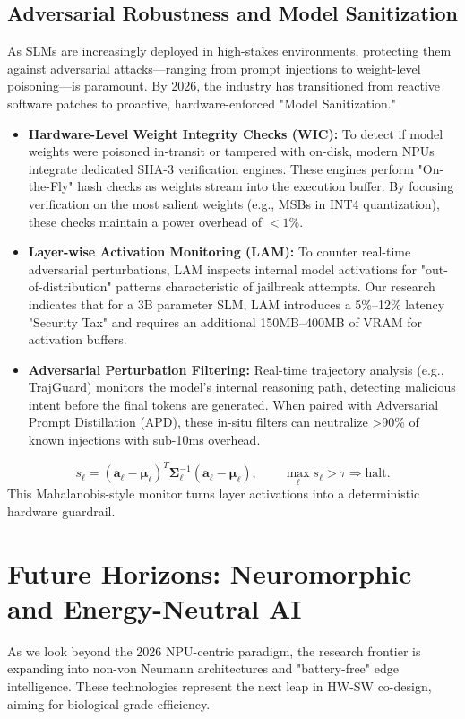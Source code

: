 \documentclass[twocolumn,10pt]{article}
\begin{document}
\subsection{Adversarial Robustness and Model Sanitization}
As SLMs are increasingly deployed in high-stakes environments, protecting them against adversarial attacks—ranging from prompt injections to weight-level poisoning—is paramount. By 2026, the industry has transitioned from reactive software patches to proactive, hardware-enforced "Model Sanitization."

\begin{itemize}
    \item \textbf{Hardware-Level Weight Integrity Checks (WIC):} To detect if model weights were poisoned in-transit or tampered with on-disk, modern NPUs integrate dedicated SHA-3 verification engines. These engines perform "On-the-Fly" hash checks as weights stream into the execution buffer. By focusing verification on the most salient weights (e.g., MSBs in INT4 quantization), these checks maintain a power overhead of $<1\%$.
    \item \textbf{Layer-wise Activation Monitoring (LAM):} To counter real-time adversarial perturbations, LAM inspects internal model activations for "out-of-distribution" patterns characteristic of jailbreak attempts. Our research indicates that for a 3B parameter SLM, LAM introduces a 5\%--12\% latency "Security Tax" and requires an additional 150MB--400MB of VRAM for activation buffers.
    \item \textbf{Adversarial Perturbation Filtering:} Real-time trajectory analysis (e.g., TrajGuard) monitors the model's internal reasoning path, detecting malicious intent before the final tokens are generated. When paired with Adversarial Prompt Distillation (APD), these in-situ filters can neutralize >90\% of known injections with sub-10ms overhead.
\end{itemize}
\begin{equation}
s_\ell=(\mathbf{a}_\ell-\boldsymbol{\mu}_\ell)^T
\boldsymbol{\Sigma}_\ell^{-1}
(\mathbf{a}_\ell-\boldsymbol{\mu}_\ell),
\qquad
\max_\ell s_\ell>\tau \Rightarrow \mathrm{halt}.
\label{eq:lam}
\end{equation}
This Mahalanobis-style monitor turns layer activations into a deterministic hardware guardrail.

\section{Future Horizons: Neuromorphic and Energy-Neutral AI}
As we look beyond the 2026 NPU-centric paradigm, the research frontier is expanding into non-von Neumann architectures and "battery-free" edge intelligence. These technologies represent the next leap in HW-SW co-design, aiming for biological-grade efficiency.
\end{document}
